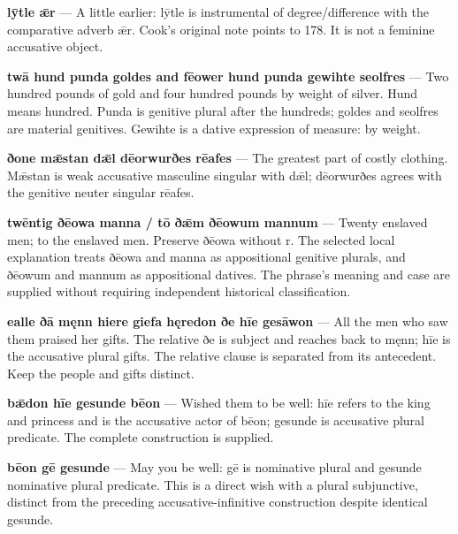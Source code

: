 \textbf{lȳtle ǣr} — A little earlier: lȳtle is instrumental of degree/\allowbreak{}difference with the comparative adverb ǣr. Cook’s original note points to 178. It is not a feminine accusative object.

\textbf{twā hund punda goldes and fēower hund punda gewihte seolfres} — Two hundred pounds of gold and four hundred pounds by weight of silver. Hund means hundred. Punda is genitive plural after the hundreds; goldes and seolfres are material genitives. Gewihte is a dative expression of measure: by weight.

\textbf{ðone mǣstan dǣl dēorwurðes rēafes} — The greatest part of costly clothing. Mǣstan is weak accusative masculine singular with dǣl; dēorwurðes agrees with the genitive neuter singular rēafes.

\textbf{twēntig ðēowa manna /\allowbreak{} tō ðǣm ðēowum mannum} — Twenty enslaved men; to the enslaved men. Preserve ðēowa without r. The selected local explanation treats ðēowa and manna as appositional genitive plurals, and ðēowum and mannum as appositional datives. The phrase’s meaning and case are supplied without requiring independent historical classification.

\textbf{ealle ðā męnn hiere giefa hęredon ðe hīe gesāwon} — All the men who saw them praised her gifts. The relative ðe is subject and reaches back to męnn; hīe is the accusative plural gifts. The relative clause is separated from its antecedent. Keep the people and gifts distinct.

\textbf{bǣdon hīe gesunde bēon} — Wished them to be well: hīe refers to the king and princess and is the accusative actor of bēon; gesunde is accusative plural predicate. The complete construction is supplied.

\textbf{bēon gē gesunde} — May you be well: gē is nominative plural and gesunde nominative plural predicate. This is a direct wish with a plural subjunctive, distinct from the preceding accusative-infinitive construction despite identical gesunde.

